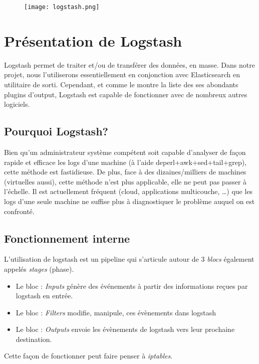\begin{figure}[H]
\center
\texttt{[image: logstash.png]}
\label{fig:logstashlogo.png}
\end{figure}
\section{Présentation de Logstash}

Logstash permet de traiter et/ou de transférer des données, en masse. Dans notre 
projet, nous l'utiliserons essentiellement en conjonction avec Elasticsearch en 
utilitaire de sorti. Cependant,
et comme le montre la liste des ses abondants plugins d'output, Logstash est capable
de fonctionner avec de nombreux autres logiciels.

\subsection{Pourquoi Logstash?}
Bien qu'un administrateur système compétent soit capable d'analyser de façon rapide 
et efficace les logs d'une machine (à l'aide deperl+awk+sed+tail+grep), cette méthode
est fastidieuse. De plus, face à des dizaines/milliers de machines (virtuelles aussi), 
cette méthode n'est plus applicable, elle ne peut pas passer à l'échelle.
Il est actuellement fréquent (cloud, applications multicouche, \ldots) que les logs 
d'une seule machine ne suffise plus à diagnostiquer le problème auquel on est confronté.

\subsection{Fonctionnement interne}
L'utilisation de logstash est un pipeline qui s'articule autour de 3 \emph{blocs} 
également appelés \emph{stages} (phase).
\begin{itemize}
    \item   Le bloc : \emph{Inputs} génère des événements à partir des informations reçues
    par logstash en entrée.
    \item   Le bloc : \emph{Filters} modifie, manipule, ces évènements dans logstash
    \item   Le bloc : \emph{Outputs} envoie les évènements de logstash vers leur 
    prochaine destination.
\end{itemize}

Cette façon de fonctionner peut faire penser à \emph{iptables}.

